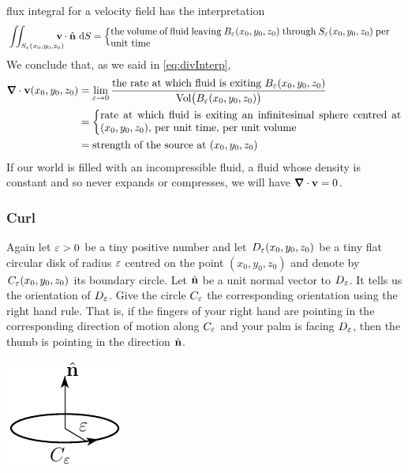 flux integral for a velocity field has the interpretation
\begin{align*}
\dblInt_{S_\veps(x_0,y_0,z_0)}\hskip-10 pt \vv\cdot\hn \ \dee{S}
&=\left\{\parbox[c]{10.0cm}{the volume of fluid leaving 
         $B_\veps(x_0,y_0,z_0)$ through
         $S_\veps(x_0,y_0,z_0)$ per unit time}\right.
\end{align*}
We conclude that, as we said in \eqref{eq:divInterp},
\begin{align*}
\vnabla\cdot\vv(x_0,y_0,z_0)
&=\lim_{\veps\rightarrow 0}
\frac{\text{the rate at which fluid is exiting $B_\veps(x_0,y_0,z_0)$}}
{\text{Vol}\big(B_\veps(x_0,y_0,z_0)\big)}
\\
&=\left\{\parbox[c]{10.0cm}{rate at which fluid is exiting
                        an infinitesimal sphere centred at $(x_0,y_0,z_0)$, 
                        per unit time, per unit volume}
\right. \\
&=\text{strength of the source at $(x_0,y_0,z_0)$}
\end{align*}
If our world is filled with an incompressible fluid, a fluid whose density
is constant and so never expands or compresses, we will have
$\vnabla\cdot\vv=0$.

\subsubsection{Curl}
Again let $\varepsilon>0$ be a tiny positive number and let $D_\varepsilon(x_0,y_0,z_0)$ 
be a tiny flat circular disk of radius $\varepsilon$ 
centred on the point  $(x_0,y_0,z_0)$ and denote by $C_\varepsilon(x_0,y_0,z_0)$ 
its boundary circle. Let $\hat{\mathbf{n}}$ be a unit normal vector to $D_\varepsilon$. It 
tells us the orientation of $D_\varepsilon$. Give the circle $C_\varepsilon$ the 
corresponding orientation using the right hand rule.
That is, if the fingers of your right hand are pointing in the corresponding
direction of motion along $C_\varepsilon$ and your palm is facing $D_\varepsilon$, then 
the thumb is pointing in the direction $\hat{\mathbf{n}}$.
\begin{nfig}
\begin{center}
    \includegraphics{prepaddle.pdf}
\end{center}
\end{nfig}


